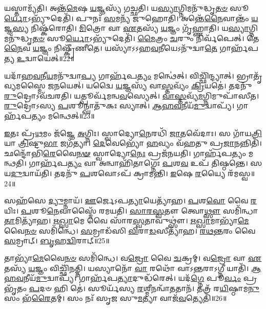 𑌯𑌸𑍍𑌤𑌾𑌮𑍍𑌯᳴𑌤𑌿।
𑌅𑌨𑍍𑌤᳴\-\ul{𑌮𑍇}\-𑌷 \ul{𑌯}\-𑌜𑍍𑌞𑌸𑍍𑌯᳴ 𑌗𑌚𑍍𑌛𑌤𑌿।
𑌯\-\ul{𑌸𑍍𑌯𑌾}\-𑌗𑍍𑌨𑌿𑌮𑌨𑍁᳴𑌦𑍍𑌧𑍃\-\ul{𑌤}\-\-\ul{𑍞} 𑌸𑍂\-\ul{𑌰𑍍𑌯𑍋}\-\-𑌽𑌭𑍍𑌯𑍁᳴𑌦𑍇𑌤𑌿᳴।
𑌪𑍁𑌨𑌃᳴ \ul{𑌸}\-𑌮𑌨𑍍𑌯᳴ 𑌜𑍁𑌹𑍋𑌤𑌿।
𑌅𑌨𑍍𑌤𑍇᳴\-\ul{𑌨𑍈}\-𑌵𑌾𑌨𑍍𑌤𑌂᳴ \ul{𑌯}\-𑌜𑍍𑌞\-\ul{𑌸𑍍𑌯} 𑌨𑌿𑌷𑍍𑌕᳴𑌰𑍋𑌤𑌿।
\-\ul{𑌮𑌿}\-𑌤𑍍𑌰𑍋 𑌵𑌾 \ul{𑌏}\-𑌤𑌸𑍍𑌯᳴ \ul{𑌯}\-𑌜𑍍𑌞𑌂 𑌗𑍃᳴𑌹𑍍𑌣𑌾𑌤𑌿।
𑌯\-\ul{𑌸𑍍𑌯𑌾}\-𑌗𑍍𑌨𑌿𑌮𑌨𑍁᳴𑌦𑍍𑌧𑍃\-\ul{𑌤}\-\-\ul{𑍞} 𑌸𑍂\-\ul{𑌰𑍍𑌯𑍋}\-\-𑌽𑌭𑍍𑌯𑍁᳴𑌦𑍇𑌤𑌿᳴।
\-\ul{𑌮𑍈}\-𑌤𑍍𑌰𑌂 \ul{𑌚}\-𑌰𑍁𑌂 𑌨𑌿𑌰𑍍𑌵᳴𑌪𑍇𑌤𑍍।
𑌤𑍇\-\ul{𑌨𑍈}\-𑌵 \ul{𑌯}\-𑌜𑍍𑌞𑌂 𑌨𑌿𑌷𑍍𑌕𑍍𑌰𑍀᳴𑌣𑍀𑌤𑍇।
𑌯𑌸𑍍𑌯𑌾᳴\-𑌽𑌽𑌹\-\ul{𑌵}\-𑌨𑍀𑌯𑍇\-𑌽𑌨𑍁᳴𑌦𑍍𑌵𑌾\-\ul{𑌤𑍇} 𑌗𑌾𑌰𑍍\mbox{}𑌹᳴𑌪𑌤𑍍𑌯 \ul{𑌉}\-𑌦𑍍𑌵𑌾𑌯𑍇॑𑌤𑍍॥22॥

𑌯𑌦𑌾᳴𑌹\-\ul{𑌵}\-𑌨𑍀\-\ul{𑌯}\-𑌮𑌨𑍁᳴𑌦𑍍𑌵𑌾\-\ul{𑌪𑍍𑌯} 𑌗𑌾𑌰𑍍\mbox{}𑌹᳴𑌪\-\ul{𑌤𑍍𑌯𑌂} 𑌮𑌨𑍍𑌥𑍇॑𑌤𑍍।
𑌵𑌿𑌚𑍍𑌛𑌿᳴𑌨𑍍𑌦𑍍𑌯𑌾𑌤𑍍।
𑌭𑍍𑌰𑌾𑌤𑍃᳴𑌵𑍍𑌯𑌮𑌸𑍍𑌮𑍈 𑌜𑌨𑌯𑍇𑌤𑍍।
𑌯𑌦𑍍𑌵𑍈 \ul{𑌯}\-𑌜𑍍𑌞𑌸𑍍𑌯᳴ 𑌵𑌾\-\ul{𑌸𑍍𑌤}\-𑌵𑍍𑌯𑌂᳴ \ul{𑌕𑍍𑌰𑌿}\-𑌯𑌤𑍇॑।
𑌤𑌦𑌨𑍁᳴ \ul{𑌰𑍁}\-𑌦𑍍𑌰𑍋\-𑌽𑌵᳴𑌚𑌰𑌤𑌿।
𑌯𑌤𑍍𑌪𑍂𑌰𑍍𑌵᳴𑌮𑌨𑍍𑌵\-\ul{𑌵}\-𑌸𑍍𑌯𑍇𑌤𑍍।
\-\ul{𑌵𑌾}\-\-\ul{𑌸𑍍𑌤}\-𑌵𑍍𑌯᳴\-\ul{𑌮}\-𑌗𑍍𑌨𑌿𑌮𑍁𑌪𑌾᳴𑌸𑍀𑌤।
\-\ul{𑌰𑍁}\-𑌦𑍍𑌰𑍋॑𑌽𑌸𑍍𑌯 \ul{𑌪}\-𑌶𑍂𑌨𑍍𑌘𑌾𑌤𑍁᳴𑌕𑌃 𑌸𑍍𑌯𑌾𑌤𑍍।
\-\ul{𑌆}\-\-\ul{𑌹}\-\-\ul{𑌵}\-𑌨𑍀𑌯᳴\-\ul{𑌮𑍁}\-𑌦𑍍𑌵𑌾𑌪𑍍𑌯᳴।
𑌗𑌾𑌰𑍍\mbox{}𑌹᳴𑌪𑌤𑍍𑌯𑌂 𑌮𑌨𑍍𑌥𑍇𑌤𑍍॥23॥

\-\ul{𑌇}\-𑌤𑌃 𑌪𑍍𑌰᳴\-\ul{𑌥}\-𑌮𑌂 𑌜᳴𑌜𑍍𑌞𑍇 \ul{𑌅}\-𑌗𑍍𑌨𑌿𑌃।
𑌸𑍍𑌵𑌾𑌦𑍍𑌯𑍋\-\ul{𑌨𑍇}\-𑌰𑌧𑌿᳴ \ul{𑌜𑌾}\-𑌤𑌵𑍇᳴𑌦𑌾𑌃।
𑌸 𑌗𑌾᳴𑌯\-\ul{𑌤𑍍𑌰𑌿}\-𑌯𑌾 \ul{𑌤𑍍𑌰𑌿}\-𑌷𑍍𑌟𑍁\-\ul{𑌭𑌾} 𑌜𑌗᳴𑌤𑍍𑌯𑌾।
\-\ul{𑌦𑍇}\-𑌵𑍇𑌭𑍍𑌯𑍋᳴ \ul{𑌹}\-𑌵𑍍𑌯𑌂 𑌵᳴𑌹𑌤𑍁 𑌪𑍍𑌰\-\ul{𑌜𑌾}\-𑌨𑌨𑍍𑌨𑌿𑌤𑌿᳴।
𑌛𑌨𑍍𑌦𑍋᳴𑌭𑌿\-\ul{𑌰𑍇}\-𑌵𑍈\-\ul{𑌨}\-\-\ul{𑍟} 𑌸𑍍𑌵𑌾𑌦𑍍𑌯𑍋\-\ul{𑌨𑍇𑌃} 𑌪𑍍𑌰𑌜᳴𑌨𑌯𑌤𑌿।
𑌗𑌾𑌰𑍍\mbox{}𑌹᳴𑌪𑌤𑍍𑌯𑌂 𑌮𑌨𑍍𑌥𑌤𑌿।
𑌗𑌾𑌰𑍍\mbox{}𑌹᳴𑌪\-\ul{𑌤𑍍𑌯𑌂} 𑌵𑌾 𑌅𑌨𑍍𑌵𑌾𑌹𑌿᳴𑌤𑌾𑌗𑍍𑌨𑍇𑌃 \ul{𑌪}\-𑌶\-\ul{𑌵} 𑌉𑌪᳴ 𑌤𑌿𑌷𑍍𑌠𑌨𑍍𑌤𑍇।
𑌸 𑌯\-\ul{𑌦𑍁}\-𑌦𑍍𑌵𑌾𑌯᳴𑌤𑌿।
𑌤𑌦𑌨𑍁᳴ \ul{𑌪}\-𑌶𑌵𑍋𑌽𑌪᳴ 𑌕𑍍𑌰𑌾𑌮𑌨𑍍𑌤𑌿।
\-\ul{𑌇}\-𑌷𑍇 \ul{𑌰}\-𑌯𑍍𑌯𑍈 𑌰᳴𑌮𑌸𑍍𑌵॥24॥

𑌸𑌹᳴𑌸𑍇 \ul{𑌦𑍍𑌯𑍁}\-𑌮𑍍𑌨𑌾𑌯᳴।
\-\ul{𑌊}\-𑌰𑍍𑌜𑍇\-𑌽𑌪\-\ul{𑌤𑍍𑌯𑌾}\-𑌯𑍇𑌤𑍍𑌯𑌾᳴𑌹।
\-\ul{𑌪}\-𑌶\-\ul{𑌵𑍋} 𑌵𑍈 \ul{𑌰}\-𑌯𑌿𑌃।
\-\ul{𑌪}\-𑌶𑍂\-\ul{𑌨𑍇}\-𑌵𑌾𑌸𑍍𑌮𑍈᳴ 𑌰𑌮𑌯𑌤𑌿।
\-\ul{𑌸𑌾}\-\-\ul{𑌰}\-\-\ul{𑌸𑍍𑌵}\-𑌤𑍗 𑌤𑍍𑌵𑍋\-\ul{𑌥𑍍𑌸𑍗} 𑌸𑌮𑌿᳴𑌨𑍍𑌧𑌾\-\ul{𑌤𑌾}\-𑌮𑌿𑌤𑍍𑌯𑌾᳴𑌹।
\-\ul{𑌋}\-\-\ul{𑌖𑍍𑌸𑌾}\-𑌮𑍇 𑌵𑍈 𑌸𑌾᳴𑌰\-\ul{𑌸𑍍𑌵}\-𑌤𑌾𑌵𑍁𑌥𑍍𑌸𑍗॑।
\-\ul{𑌋}\-\-\ul{𑌖𑍍𑌸𑌾}\-𑌮𑌾𑌭𑍍𑌯𑌾᳴\-\ul{𑌮𑍇}\-𑌵𑍈\-\ul{𑌨}\-\-\ul{𑍞} 𑌸𑌮𑌿᳴𑌨𑍍𑌧𑍇।
\-\ul{𑌸}\-𑌮𑍍𑌰𑌾𑌡᳴𑌸𑌿 \ul{𑌵𑌿}\-𑌰𑌾\-\ul{𑌡}\-𑌸𑍀𑌤𑍍𑌯𑌾᳴𑌹।
\-\ul{𑌰}\-\-\ul{𑌥}\-\-\ul{𑌨𑍍𑌤}\-𑌰𑌂 𑌵𑍈 \ul{𑌸}\-𑌮𑍍𑌰𑌾𑌟𑍍।
\-\ul{𑌬𑍃}\-𑌹\-\ul{𑌦𑍍𑌵𑌿}\-𑌰𑌾𑌟𑍍॥25॥

𑌤𑌾𑌭𑍍𑌯𑌾᳴\-\ul{𑌮𑍇}\-𑌵𑍈\-\ul{𑌨}\-\-\ul{𑍞} 𑌸𑌮𑌿᳴𑌨𑍍𑌧𑍇।
𑌵\-\ul{𑌜𑍍𑌰𑍋} 𑌵𑍈 \ul{𑌚}\-𑌕𑍍𑌰𑌮𑍍।
𑌵\-\ul{𑌜𑍍𑌰𑍋} 𑌵𑌾 \ul{𑌏}\-𑌤𑌸𑍍𑌯᳴ \ul{𑌯}\-𑌜𑍍𑌞𑌂 𑌵𑌿𑌚𑍍𑌛𑌿᳴𑌨𑌤𑍍𑌤𑌿।
𑌯𑌸𑍍𑌯𑌾𑌨𑍋᳴ \ul{𑌵𑌾} 𑌰𑌥𑍋᳴ 𑌵𑌾𑌽\-\ul{𑌨𑍍𑌤}\-𑌰𑌾\-𑌽𑌗𑍍𑌨𑍀 𑌯𑌾𑌤𑌿᳴।
\-\ul{𑌆}\-\-\ul{𑌹}\-\-\ul{𑌵}\-𑌨𑍀𑌯᳴\-\ul{𑌮𑍁}\-𑌦𑍍𑌵𑌾𑌪𑍍𑌯᳴।
𑌗𑌾𑌰𑍍\mbox{}𑌹᳴𑌪\-\ul{𑌤𑍍𑌯𑌾}\-𑌦𑍁𑌦𑍍𑌧᳴𑌰𑍇𑌤𑍍।
𑌯𑌦᳴\-\ul{𑌗𑍍𑌨𑍇} 𑌪𑍂\-\ul{𑌰𑍍𑌵𑌂} 𑌪𑍍𑌰𑌭𑍃᳴𑌤𑌂 \ul{𑌪}\-𑌦𑍞 𑌹𑌿 𑌤𑍇॑।
𑌸𑍂𑌰𑍍𑌯᳴𑌸𑍍𑌯 \ul{𑌰}\-𑌶𑍍𑌮𑍀𑌨𑌨𑍍𑌵𑌾᳴\-\ul{𑌤}\-𑌤𑌾𑌨᳴।
𑌤𑌤𑍍𑌰᳴ 𑌰\-\ul{𑌯𑌿}\-𑌷𑍍𑌠𑌾𑌮\-\ul{𑌨𑍁} 𑌸𑌂 𑌭᳴\-\ul{𑌰𑍈}\-𑌤𑌮𑍍।
𑌸𑌂 𑌨𑌃᳴ 𑌸𑍃𑌜 𑌸𑍁\-\ul{𑌮}\-𑌤𑍍𑌯𑌾 𑌵𑌾𑌜᳴\-\ul{𑌵}\-𑌤𑍍𑌯𑍇𑌤𑌿᳴॥26॥

